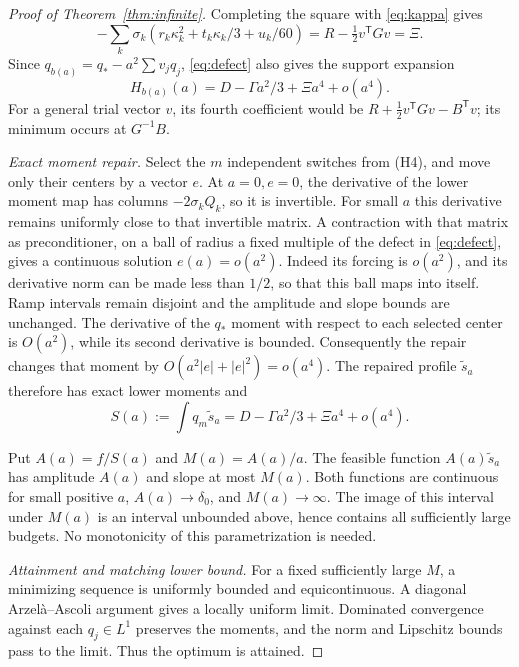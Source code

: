 \begin{proof}[Proof of Theorem~\ref{thm:infinite}]
Completing the square with \eqref{eq:kappa} gives
\[
 -\sum_k\sigma_k
 (r_k\kappa_k^2+t_k\kappa_k/3+u_k/60)
   =R-\tfrac12v^{\mathsf T}Gv=\Xi .
\]
Since \(q_{b(a)}=q_*-a^2\sum v_jq_j\),
\eqref{eq:defect} also gives the support expansion
\begin{equation}\label{eq:supportexp}
 H_{b(a)}(a)=D-\Gamma a^2/3+\Xi a^4+o(a^4).
\end{equation}
For a general trial vector \(v\), its fourth coefficient would be
\(R+\tfrac12v^{\mathsf T}Gv-B^{\mathsf T}v\);
its minimum occurs at \(G^{-1}B\).

\emph{Exact moment repair.}
Select the \(m\) independent switches from (H4), and move only their
centers by a vector \(e\). At \(a=0,e=0\), the derivative of the lower
moment map has columns \(-2\sigma_kQ_k\), so it is invertible.
For small \(a\) this derivative remains uniformly close to that invertible
matrix. A contraction with that matrix as preconditioner, on a ball of
radius a fixed multiple of the defect in \eqref{eq:defect}, gives a
continuous solution \(e(a)=o(a^2)\).
Indeed its forcing is \(o(a^2)\), and its derivative norm can be made
less than \(1/2\), so that this ball maps into itself.
Ramp intervals remain disjoint and the amplitude and slope bounds are
unchanged. The derivative of the \(q_*\) moment with respect to each
selected center is \(O(a^2)\), while its second derivative is bounded.
Consequently the repair changes that moment by
\(O(a^2|e|+|e|^2)=o(a^4)\).
The repaired profile \(\widetilde s_a\) therefore has exact lower
moments and
\begin{equation}\label{eq:primalexp}
 S(a):=\int q_m\widetilde s_a
      =D-\Gamma a^2/3+\Xi a^4+o(a^4).
\end{equation}

Put \(A(a)=f/S(a)\) and \(M(a)=A(a)/a\).
The feasible function \(A(a)\widetilde s_a\) has amplitude \(A(a)\)
and slope at most \(M(a)\). Both functions are continuous for small
positive \(a\), \(A(a)\to\delta_0\), and \(M(a)\to\infty\).
The image of this interval under \(M(a)\) is an interval unbounded
above, hence contains all sufficiently large budgets. No monotonicity
of this parametrization is needed.

\emph{Attainment and matching lower bound.}
For a fixed sufficiently large \(M\), a minimizing sequence is uniformly
bounded and equicontinuous. A diagonal Arzel\`a--Ascoli argument gives a
locally uniform limit. Dominated convergence against each \(q_j\in L^1\)
preserves the moments, and the norm and Lipschitz bounds pass to the
limit. Thus the optimum is attained.


\end{proof}
